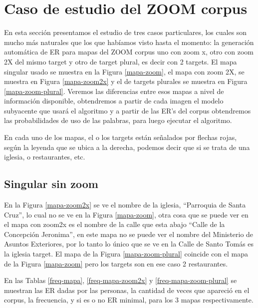 \section{Caso de estudio del ZOOM corpus}

En esta secci\'on presentamos el estudio de tres casos particulares, los cuales son mucho m\'as naturales que los que hab\'iamos visto hasta el momento: la generaci\'on autom\'atica de ER para mapas del ZOOM corpus uno con zoom x, otro con zoom 2X del mismo target y otro de target plural, es decir con 2 targets. El mapa singular usado se muestra en la Figura \ref{mapa-zoom}, el mapa con zoom 2X, se muestra en Figura \ref{mapa-zoom2x} y el de targets plurales se muestra en Figura \ref{mapa-zoom-plural}. Veremos las diferencias entre esos mapas a nivel de informaci\'on disponible, obtendremos a partir de cada imagen el modelo subyacente que usar\'a el algoritmo y a partir de las ER's del corpus obtendremos las probabilidades de uso de las palabras, para luego ejecutar el algoritmo.

En cada uno de los mapas, el o los targets est\'an se\~nalados por flechas rojas, seg\'un la leyenda que se ubica a la derecha, podemos decir que si se trata de una iglesia, o restaurantes, etc. 


\subsection{Singular sin zoom}
En la Figura \ref{mapa-zoom2x} se ve el nombre de la iglesia, ``Parroquia de Santa Cruz'', lo cual no se ve en la Figura \ref{mapa-zoom}, otra cosa que se puede ver en el mapa con zoom2x es el nombre de la calle que esta abajo ``Calle de la Concepci\'on Jeronima'', en este mapa no se puede ver el nombre del Ministerio de Asuntos Exteriores, por lo tanto lo \'unico que se ve en la Calle de Santo Tom\'as es la iglesia target. El mapa de la Figura \ref{mapa-zoom-plural} coincide con el mapa de la Figura \ref{mapa-zoom} pero los targets son en ese caso 2 restaurantes.

En las Tablas \ref{freq-mapa}, \ref{freq-mapa-zoom2x} y \ref{freq-mapa-zoom-plural} se muestran las ER dadas por las personas, la cantidad de veces que apareci\'o en el corpus, la frecuencia, y si es o no ER minimal, para los 3 mapas respectivamente.


